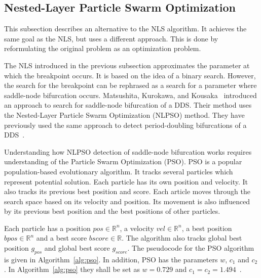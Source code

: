 \subsection{Nested-Layer Particle Swarm Optimization}
This subsection describes an alternative to the NLS algorithm.
It achieves the same goal as the NLS, but uses a different approach.
This is done by reformulating the original problem as an optimization problem.
\par
The NLS introduced in the previous subsection approximates the parameter at which the breakpoint occurs.
It is based on the idea of a binary search.
However, the search for the breakpoint can be rephrased as a search for a parameter where saddle-node bifurcation occurs.
Matsushita, Kurokawa, and Kousaka~\cite{Matsushita2019} introduced an approach to search for saddle-node bifurcation of a DDS.
Their method uses the Nested-Layer Particle Swarm Optimization (NLPSO) method.
They have previously used the same approach to detect period-doubling bifurcations of a DDS~\cite{Matsushita20170721}.
\par
Understanding how NLPSO detection of saddle-node bifurcation works requires understanding of the Particle Swarm Optimization (PSO).
PSO is a popular population-based evolutionary algorithm.
It tracks several particles which represent potential solution.
Each particle has its own position and velocity. It also tracks its previous best position and score.
Each article moves through the search space based on its velocity and position.
Its movement is also influenced by its previous best position and the best positions of other particles.~\cite{Matsushita2019}
\par
Each particle has a position $pos \in \mathbb{R}^{n}$, a velocity $vel \in \mathbb{R}^{n}$, a best position $bpos \in \mathbb{R}^{n}$ and a best score $bscore \in \mathbb{R}$.
The algorithm also tracks global best position $g_{pos}$ and global best score $g_{score}$.
The pseudocode for the PSO algorithm is given in Algorithm~\ref{alg:pso}.
In addition, PSO has the parameters $w$, $c_{1}$ and $c_{2}$.
In Algorithm~\ref{alg:pso} they shall be set as $w=0.729$ and $c_{1}=c_{2}=1.494$~\cite{Matsushita2019}.

